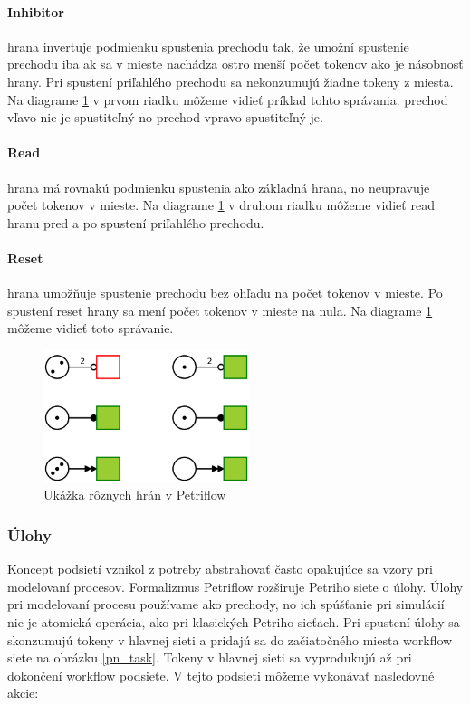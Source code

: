 \paragraph{Inhibitor} hrana invertuje  podmienku spustenia prechodu tak, že umožní spustenie prechodu iba ak sa v mieste nachádza ostro menší počet tokenov ako je násobnosť hrany. Pri spustení priľahlého prechodu sa nekonzumujú žiadne tokeny z miesta. Na diagrame  \ref{pn_arc_types} v prvom riadku môžeme vidieť príklad tohto správania. prechod vľavo nie je spustiteľný no prechod vpravo spustiteľný je. 

\paragraph{Read} hrana má rovnakú podmienku spustenia ako základná hrana, no neupravuje počet tokenov v mieste. Na diagrame  \ref{pn_arc_types} v druhom riadku môžeme vidieť read hranu pred a po spustení priľahlého prechodu. 
 
\paragraph{Reset} hrana umožňuje spustenie prechodu bez ohľadu na počet tokenov v mieste. Po spustení reset hrany sa mení počet tokenov v mieste na nula. Na diagrame \ref{pn_arc_types} môžeme vidieť toto správanie.

\begin{figure}[!htbp]
\centering
\includegraphics[width=6cm]{img/pn_arc_types.png}
\caption{Ukážka rôznych hrán v Petriflow}
\label{pn_arc_types}
\end{figure}

\subsubsection{Úlohy}
Koncept podsietí vznikol z potreby abstrahovať často opakujúce sa vzory pri modelovaní procesov. Formalizmus Petriflow rozširuje Petriho siete o úlohy. Úlohy pri modelovaní procesu používame ako prechody, no ich spúšťanie pri simulácií nie je atomická operácia, ako pri klasických Petriho sieťach. Pri spustení úlohy sa skonzumujú tokeny v hlavnej sieti a pridajú sa do začiatočného miesta workflow siete na obrázku  \ref{pn_task}. Tokeny v hlavnej sieti sa vyprodukujú až pri dokončení workflow podsiete. V tejto podsieti môžeme vykonávať nasledovné akcie: 

